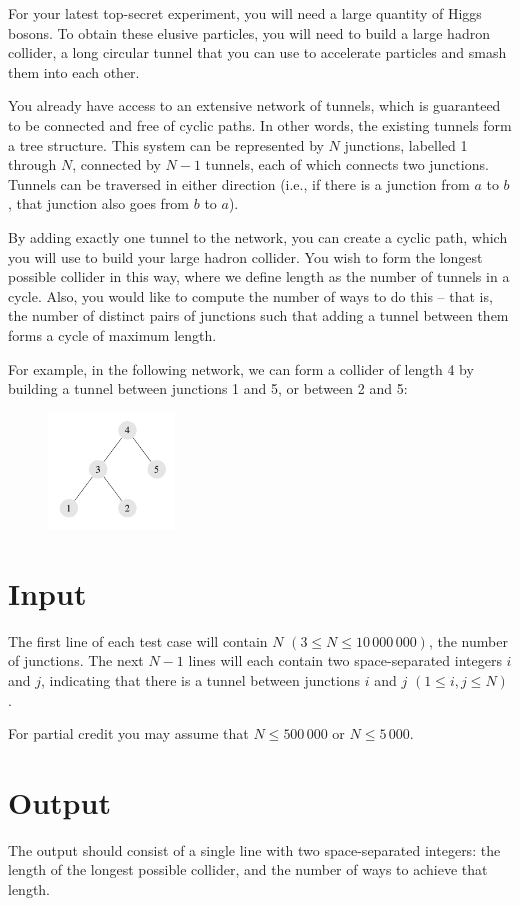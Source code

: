 For your latest top-secret experiment, you will need a large quantity of Higgs bosons. To obtain
these elusive particles, you will need to build a large hadron collider, a long circular tunnel that
you can use to accelerate particles and smash them into each other.

You already have access to an extensive network of tunnels, which is guaranteed to be connected
and free of cyclic paths. In other words, the existing tunnels form a tree structure. This system can
be represented by $N$ junctions, labelled 1 through $N$, connected by $N - 1$ tunnels, each of which
connects two junctions. Tunnels can be traversed in either direction (i.e., if there is a junction from
$a$ to $b$, that junction also goes from $b$ to $a$).

By adding exactly one tunnel to the network, you can create a cyclic path, which you will use to
build your large hadron collider. You wish to form the longest possible collider in this way, where
we define length as the number of tunnels in a cycle. Also, you would like to compute the number of
ways to do this -- that is, the number of distinct pairs of junctions such that adding a tunnel
between them forms a cycle of maximum length.

For example, in the following network, we can form a collider of length 4 by building a tunnel
between junctions 1 and 5, or between 2 and 5:
\begin{figure}[h]
    \begin{center}
    \includegraphics[width=0.3\textwidth]{lhc}
    \end{center}
\end{figure}

\section*{Input}
The first line of each test case will contain $N$ $(3 \le N \le 10\,000\,000)$, the number of junctions.
The next $N - 1$ lines will each contain two space-separated integers $i$ and $j$, indicating that
there is a tunnel between junctions $i$ and $j$ $(1 \le i, j \le N)$.

For partial credit you may assume that $N\le 500\,000$ or $N \le 5\,000$.

\section*{Output}
The output should consist of a single line with two space-separated integers: the length of the
longest possible collider, and the number of ways to achieve that length.

